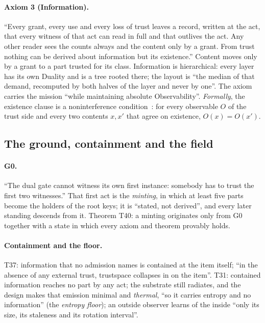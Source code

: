 \documentclass[11pt,a4paper]{article}
\theoremstyle{definition}
\theoremstyle{remark}
\theoremstyle{definition}
\begin{document}
\paragraph{Axiom 3 (Information).} ``Every grant, every use and every loss of trust leaves a record, written at the act, that every witness
of that act can read in full and that outlives the act. Any other reader sees the counts always and the content only by a grant. From trust
nothing can be derived about information but its existence.'' Content moves only by a grant to a part trusted for its class. Information
is hierarchical: every layer has its own Duality and is a tree rooted there; the layout is ``the median of that demand, recomputed by both
halves of the layer and never by one''. The axiom carries the mission ``while maintaining absolute Observability''. \emph{Formally}, the
existence clause is a noninterference condition~\cite{gm}: for every observable $O$ of the trust side and every two contents $x,x'$ that
agree on existence, $O(x)=O(x')$.

\subsection{The ground, containment and the field}

\paragraph{G0.} ``The dual gate cannot witness its own first instance: somebody has to trust the first two witnesses.'' That first act is
the \emph{minting}, in which at least five parts become the holders of the root keys; it is ``stated, not derived'', and every later
standing descends from it. Theorem T40: a minting originates only from G0 together with a state in which every axiom and theorem
provably holds.

\paragraph{Containment and the floor.} T37: information that no admission names is contained at the item itself; ``in the absence of any
external trust, trustspace collapses in on the item''. T31: contained information reaches no part by any act; the substrate still
radiates, and the design makes that emission minimal and \emph{thermal}, ``so it carries entropy and no information'' (the \emph{entropy
floor}); an outside observer learns of the inside ``only its size, its staleness and its rotation interval''.
\end{document}
